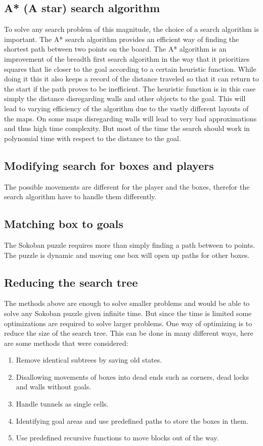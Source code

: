 \documentclass{article}
\begin{document}
\subsection { A* (A star) search algorithm}
To solve any search problem of this magnitude, the choice of a search algorithm is important. The A* search algorithm provides an efficient way of finding the shortest path between two points on the board. The A* algorithm is an improvement of the breadth first search algorithm in the way that it prioritizes squares that lie closer to the goal according to a certain heuristic function. While doing it this it also keeps a record of the distance traveled so that it can return to the start if the path proves to be inefficient. The heuristic function is in this case simply the distance disregarding walls and other objects to the goal. This will lead to varying efficiency of the algorithm due to the vastly different layouts of the maps. On some maps disregarding walls will lead to very bad approximations and thus high time complexity. But most of the time the search should work in polynomial time with respect to the distance to the goal. 

\subsection { Modifying search for boxes and players}
The possible movements are different for the player and the boxes, therefor the search algorithm have to handle them differently. 
\subsection { Matching box to goals}
The Sokoban puzzle requires more than simply finding a path between to points. The puzzle is dynamic and moving one box will open up paths for other boxes. 
\subsection { Reducing the search tree}
The methods above are enough to solve smaller problems and would be able to solve any Sokoban puzzle given infinite time. But since the time is limited some  optimizations are required to solve larger problems. One way of optimizing is to reduce the size of the search tree. This can be done in many different ways, here are some methods that were considered:
\begin{enumerate} 
\setlength{\itemsep}{0pt}
\setlength{\parskip}{0pt}
\setlength{\parsep}{0pt}
\item Remove identical subtrees by saving old states.
\item Disallowing movements of boxes into dead ends such as corners, dead locks and walls without goals.
\item Handle tunnels as single cells.
\item Identifying goal areas and use predefined paths to store the boxes in them.
\item Use predefined recursive functions to move blocks out of the way.
\end{enumerate}
\end{document}
